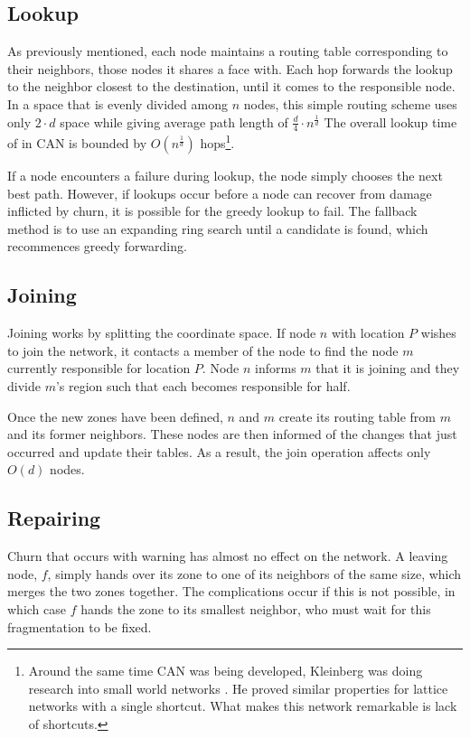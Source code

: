 \documentclass[10pt,letterpaper,twoside]{report}
\begin{document}
\subsection*{Lookup}
As previously mentioned, each node maintains a routing table corresponding to their neighbors, those nodes it shares a face with.
Each hop forwards the lookup to the neighbor closest to the destination, until it comes to the responsible node.
In a space that is evenly divided among $n$ nodes, this simple routing scheme uses only $2 \cdot d$ space while giving average path length of $\frac{d}{4}\cdot n^{\frac{1}{d}}$
The overall lookup time of in CAN is bounded by $O(n^{\frac{1}{d}})$ hops\footnote{Around the same time CAN was being developed, Kleinberg was doing research into small world networks \cite{kleinberg2000small}.  
He proved similar properties for lattice networks with a single shortcut.  What makes this network remarkable is lack of shortcuts.}.

If a node encounters a failure during lookup, the node simply chooses the next best path.
However, if lookups occur before a node can recover from damage inflicted by churn, it is possible for the greedy lookup to fail.
The fallback method is to use an expanding ring search until a candidate is found, which recommences greedy forwarding.

\subsection*{Joining}
Joining works by splitting the coordinate space.  
If node $n$ with location $P$ wishes to join the network, it contacts a member of the node to find the node $m$ currently responsible for location $P$.
Node $n$ informs $m$ that it is joining and they divide $m$'s region such that each becomes responsible for half.


Once the new zones have been defined, $n$ and $m$ create its routing table from $m$ and its former neighbors.
These nodes are then informed of the changes that just occurred and update their tables.
As a result, the join operation affects only $O(d)$ nodes.  



\subsection*{Repairing}

Churn that occurs with warning has almost no effect on the network.
A leaving node, $f$, simply hands over its zone to one of its neighbors of the same size, which merges the two zones together.
The complications occur if this is not possible, in which case  $f$ hands the zone to its smallest neighbor, who must wait for this fragmentation to be fixed.
\end{document}
